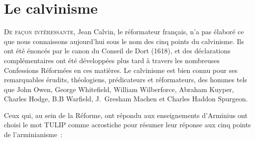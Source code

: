 \chapter{Le calvinisme}

\lettrine{D}{e façon intéressante,} Jean Calvin, le réformateur français, n'a pas élaboré
 ce que nous connaissons aujourd'hui sous le nom des cinq points du calvinisme.
 Ils ont été énoncés par le canon du Conseil de Dort (1618), et des déclarations
 complémentaires ont été développées plus tard à travers les nombreuses
 Confessions Réformées en ces matières. Le calvinisme est bien connu
 pour 
 ses remarquables érudits, théologiens, prédicateurs et réformateurs,
 des hommes tels que John Owen, George Whitefield,
 William Wilberforce, Abraham Kuyper, Charles Hodge, \pocketlinebreak
 B.B Warfield, J.~Gresham Machen et \pocketlinebreak
 Charles Haddon Spurgeon.

Ceux qui, au sein de la Réforme, ont répondu aux enseignements d'Arminius
 ont choisi le mot \og TULIP \fg{} comme acrostiche pour résumer
 leur réponse aux cinq points de l'arminianisme~:

